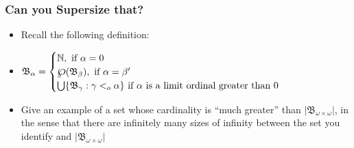 \begin{frame}
\frametitle{Can you Supersize that?}

\begin{itemize}[<+->]
\item Recall the following definition: 
 \item[] \(
\mathfrak{B}_\alpha=
\begin{cases}
\mathbb{N}, \text{ if $\alpha = 0$}\\
\powerset(\mathfrak{B}_\beta), \text{ if $\alpha = \beta'$}\\
\bigcup \{\mathfrak{B}_\gamma : \gamma <_o \alpha\} \text{ if $\alpha$ is a limit ordinal greater than $0$}
\end{cases}
\)

\item Give an example of a set whose cardinality is ``much greater'' than $|\mathfrak{B}_{\omega \times \omega}|$, in the sense that there are infinitely many sizes of infinity between the set you identify and $|\mathfrak{B}_{\omega \times \omega}|$






\end{itemize}
\end{frame}


